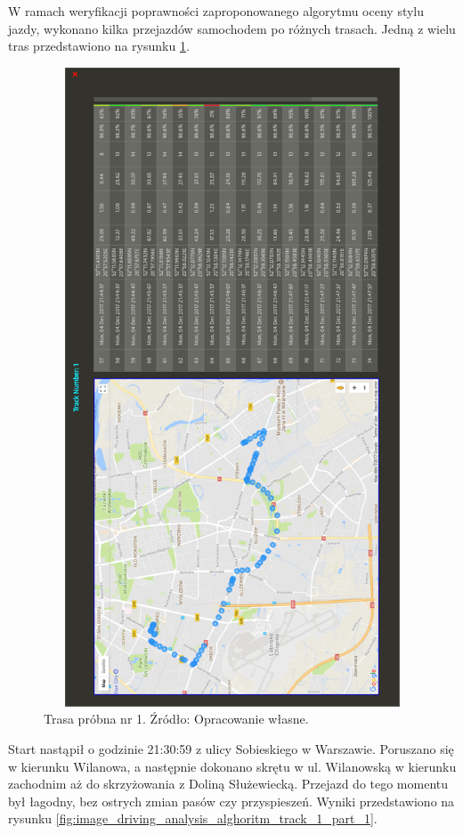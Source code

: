 W ramach weryfikacji poprawności zaproponowanego algorytmu oceny stylu jazdy, wykonano kilka przejazdów samochodem po różnych trasach. Jedną z wielu tras przedstawiono na rysunku \ref{fig:image_driving_analysis_alghoritm_track_1}.

\begin{figure}[H]
	\centering
	\includegraphics[height=19cm, width=13cm]{img/driving_analysis/test_track_1.png}
	\caption{Trasa próbna nr 1. Źródło: Opracowanie własne.}
	\label{fig:image_driving_analysis_alghoritm_track_1}
\end{figure}

Start nastąpił o godzinie 21:30:59 z ulicy Sobieskiego w Warszawie. Poruszano się w kierunku Wilanowa, a następnie dokonano skrętu w ul. Wilanowską w kierunku zachodnim aż do skrzyżowania z Doliną Służewiecką. Przejazd do tego momentu był łagodny, bez ostrych zmian pasów czy przyspieszeń. Wyniki przedstawiono na rysunku \ref{fig:image_driving_analysis_alghoritm_track_1_part_1}.

